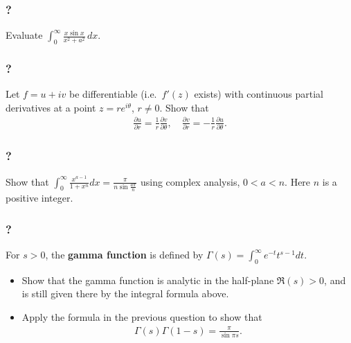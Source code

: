 \hypertarget{section-130}{%
\subsubsection{?}\label{section-130}}

Evaluate
\(\displaystyle{ \int_{0}^{\infty}\frac{x\sin x}{x^2+a^2} \, dx }\).

\hypertarget{section-131}{%
\subsubsection{?}\label{section-131}}

Let \(f=u+iv\) be differentiable (i.e.~\(f'(z)\) exists) with continuous
partial derivatives at a point \(z=re^{i\theta}\), \(r\not= 0\). Show
that
\begin{align*}\frac{\partial u}{\partial r}=\frac{1}{r}\frac{\partial v}{\partial \theta},\quad
\frac{\partial v}{\partial r}=-\frac{1}{r}\frac{\partial u}{\partial \theta}.\end{align*}

\hypertarget{section-132}{%
\subsubsection{?}\label{section-132}}

Show that
\(\displaystyle \int_0^\infty \frac{x^{a-1}}{1+x^n} dx=\frac{\pi}{n\sin \frac{a\pi}{n}}\)
using complex analysis, \(0< a < n\). Here \(n\) is a positive integer.

\hypertarget{section-133}{%
\subsubsection{?}\label{section-133}}

For \(s>0\), the \textbf{gamma function} is defined by
\(\displaystyle{\Gamma(s)=\int_0^{\infty} e^{-t}t^{s-1} dt}\).

\begin{itemize}
\item
  Show that the gamma function is analytic in the half-plane
  \(\Re (s)>0\), and is still given there by the integral formula above.
\item
  Apply the formula in the previous question to show that
  \begin{align*}\Gamma(s)\Gamma(1-s)=\frac{\pi}{\sin \pi s}.\end{align*}
\end{itemize}

